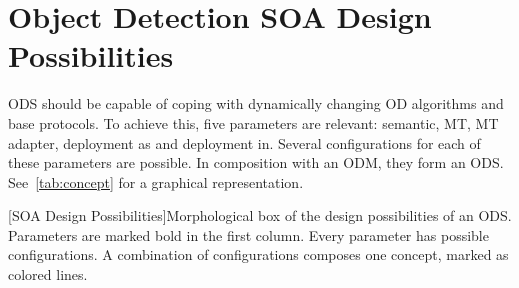 \chapter{Object Detection SOA Design Possibilities\label{cha:chapter3}}
\label{sec:concecptOverview}
ODS should be capable of coping with dynamically changing OD algorithms and base protocols. To achieve this, five parameters are relevant: semantic, MT, MT adapter, deployment as and deployment in. Several configurations for each of these parameters are possible. In composition with an ODM, they form an ODS. See~\ref{tab:concept} for a graphical representation.

\begin{table}[ht]
    \begin{center}
      \begin{minipage}{\textwidth}
        [SOA Design Possibilities]{Morphological box of the design possibilities of an ODS. Parameters are marked bold in the first column. Every parameter has possible configurations. A combination of configurations composes one concept, marked as colored lines.}\label{tab:concept} 
\end{minipage}
\end{center}
\end{table}

